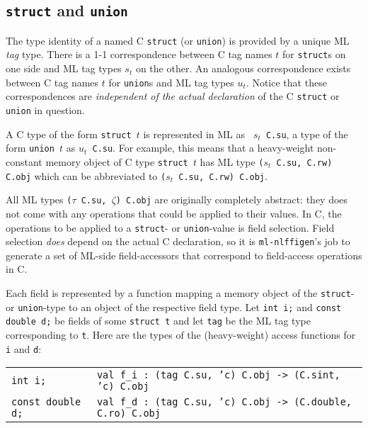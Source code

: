 \documentclass[titlepage,letterpaper]{article}
\newcommand{\gentool}{{\tt ml-nlffigen}}
\begin{document}
\subsection{{\tt struct} and {\tt union}}

The type identity of a named C {\tt struct} (or {\tt union}) is
provided by a unique ML {\em tag} type.  There is a 1-1 correspondence
between C tag names $t$ for {\tt struct}s on one side and ML tag types
$s_t$ on the other.  An analogous correspondence exists between C tag
names $t$ for {\tt union}s and ML tag types $u_t$.  Notice that these
correspondences are {\em independent of the actual declaration} of the
C {\tt struct} or {\tt union} in question.

A C type of the form {\tt struct $t$} is represented in ML as {\tt
  $s_t$ C.su}, a type of the form {\tt union $t$} as {\tt $u_t$ C.su}.
For example, this means that a heavy-weight non-constant memory object
of C type {\tt struct $t$} has ML type {\tt ($s_t$ C.su, C.rw) C.obj}
which can be abbreviated to {\tt ($s_t$ C.su, C.rw) C.obj}.

All ML types {\tt ($\tau$ C.su, $\zeta$) C.obj} are originally
completely abstract: they does not come with any operations that could
be applied to their values.  In C, the operations to be applied to a
{\tt struct}- or {\tt union}-value is field selection.  Field
selection {\em does} depend on the actual C declaration, so it is
{\gentool}'s job to generate a set of ML-side field-accessors that
correspond to field-access operations in C.

Each field is represented by a function mapping a memory object of the
{\tt struct}- or {\tt union}-type to an object of the respective field
type.  Let {\tt int i;} and {\tt const double d;} be fields of some
{\tt struct t} and let {\tt tag} be the ML tag type corresponding to
{\tt t}.  Here are the types of the (heavy-weight) access functions
for {\tt i} and {\tt d}:

\begin{small}
\begin{center}
\begin{tabular}{l@{~~~~$\leadsto$~~~~}l}
{\tt int i;} &
  {\tt val f\_i : (tag C.su, 'c) C.obj -> (C.sint, 'c) C.obj} \\
{\tt const double d;} &
  {\tt val f\_d : (tag C.su, 'c) C.obj -> (C.double, C.ro) C.obj}
\end{tabular}
\end{center}
\end{small}
\end{document}
